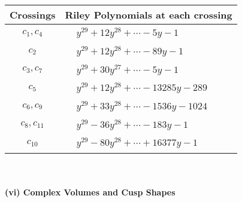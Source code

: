 \documentclass[1p]{elsarticle_modified}
\theoremstyle{definition}
\begin{document}
\begin{tabular}{m{50pt}|m{274pt}}
Crossings & \hspace{64pt}Riley Polynomials at each crossing \\
\hline $$\begin{aligned}c_{1},c_{4}\end{aligned}$$&$\begin{aligned}
&y^{29}+12 y^{28}+\cdots-5 y-1
\end{aligned}$\\
\hline $$\begin{aligned}c_{2}\end{aligned}$$&$\begin{aligned}
&y^{29}+12 y^{28}+\cdots-89 y-1
\end{aligned}$\\
\hline $$\begin{aligned}c_{3},c_{7}\end{aligned}$$&$\begin{aligned}
&y^{29}+30 y^{27}+\cdots-5 y-1
\end{aligned}$\\
\hline $$\begin{aligned}c_{5}\end{aligned}$$&$\begin{aligned}
&y^{29}+12 y^{28}+\cdots-13285 y-289
\end{aligned}$\\
\hline $$\begin{aligned}c_{6},c_{9}\end{aligned}$$&$\begin{aligned}
&y^{29}+33 y^{28}+\cdots-1536 y-1024
\end{aligned}$\\
\hline $$\begin{aligned}c_{8},c_{11}\end{aligned}$$&$\begin{aligned}
&y^{29}-36 y^{28}+\cdots-183 y-1
\end{aligned}$\\
\hline $$\begin{aligned}c_{10}\end{aligned}$$&$\begin{aligned}
&y^{29}-80 y^{28}+\cdots+16377 y-1
\end{aligned}$\\
\hline
\end{tabular}\\~\\
\newpage\flushleft \textbf{(vi) Complex Volumes and Cusp Shapes}
\end{document}
